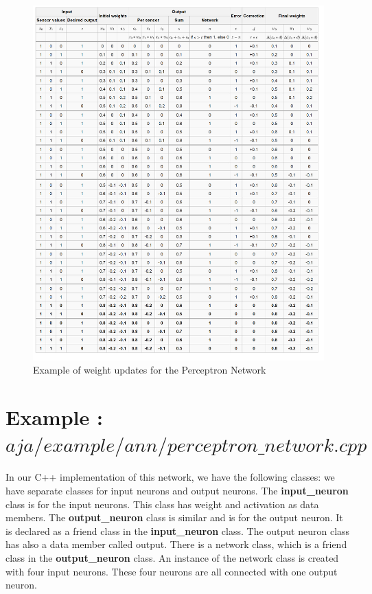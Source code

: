 \documentclass[12pt, right open]{memoir}
\begin{document}
\begin{figure}
\caption{Example of weight updates for the Perceptron Network}
\label{tab:example_of_weight_update_for_the_perceptron_network}
\centering
\includegraphics[scale=.5]{example_weight_updates_perceptron_network.png}
\end{figure}

\section{Example : $aja/example/ann/perceptron\_network.cpp$}


In our C++ implementation of this network, we have the following classes: we have separate classes for input neurons and output neurons. The \textbf{input\_neuron} class is for the input neurons. This class has weight and activation as data members. The \textbf{output\_neuron} class is similar and is for the output neuron. It is declared as a friend class in the \textbf{input\_neuron} class. The output neuron class has also a data member called output. There is a network class, which is a friend class in the \textbf{output\_neuron} class. An instance of the network class is created with four input neurons. These four neurons are all connected with one output neuron.
\end{document}
